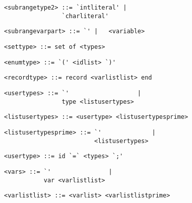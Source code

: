 \begin{footnotesize}
\begin{lstlisting}[frame=single, label={subrangetypeprime}, language=pie]
<subrangetype2> ::= `intliteral' | 
		        `charliteral'
\end{lstlisting}

\begin{lstlisting}[frame=single, label={subrangevarpart}, language=pie]
<subrangevarpart> ::= `' |   <variable>
\end{lstlisting}

\begin{lstlisting}[frame=single, label={settype}, language=pie]
<settype> ::= set of <types>
\end{lstlisting}

\begin{lstlisting}[frame=single, label={enumtype}, language=pie]
<enumtype> ::= `(' <idlist> `)'
\end{lstlisting}

\begin{lstlisting}[frame=single, label={recordtype}, language=pie]
<recordtype> ::= record <varlistlist> end
\end{lstlisting}

\begin{lstlisting}[frame=single, label={usertypes}]
<usertypes> ::= `'                   |
                type <listusertypes>
\end{lstlisting}

\begin{lstlisting}[frame=single, label={listusertypes}]
<listusertypes> ::= <usertype> <listusertypesprime>
\end{lstlisting}

\begin{lstlisting}[frame=single, label={listusertypesprime}]
<listusertypesprime> ::= `'              |
                         <listusertypes>
\end{lstlisting}

\begin{lstlisting}[frame=single, label={usertype}]
<usertype> ::= id `=` <types> `;'
\end{lstlisting}

\begin{lstlisting}[frame=single, label={vars}, language=pie]
<vars> ::= `'                |
           var <varlistlist>
\end{lstlisting}

\begin{lstlisting}[frame=single, label={varlistlist}, language=pie]
<varlistlist> ::= <varlist> <varlistlistprime>
\end{lstlisting}


\end{footnotesize}
